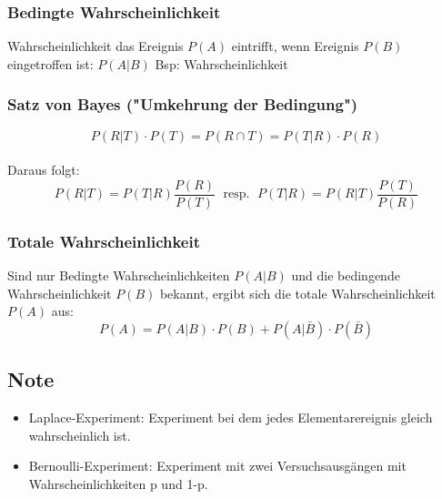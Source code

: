 \documentclass[margin=normal]{tex/hsrzf}
\begin{document}
\begin{multicols}{2}

    \subsubsection{Bedingte Wahrscheinlichkeit}
    Wahrscheinlichkeit das Ereignis $P(A)$ eintrifft,
    wenn Ereignis $P(B)$ eingetroffen ist: $P(A|B)$
    Bsp: Wahrscheinlichkeit
    \subsubsection*{Satz von Bayes ("Umkehrung der Bedingung")}
    $$P(R|T) \cdot P(T) = P(R \cap T) = P(T|R) \cdot P(R)$$
    \\ Daraus folgt: $$P(R|T) = P(T|R) \frac{P(R)}{P(T)}\;
        \textrm{ resp. } \; P(T|R) = P(R|T) \frac{P(T)}{P(R)}$$
    \subsubsection{Totale Wahrscheinlichkeit}
    Sind nur Bedingte Wahrscheinlichkeiten $P(A|B)$ und die bedingende Wahrscheinlichkeit
    $P(B)$ bekannt, ergibt sich die totale Wahrscheinlichkeit $P(A)$ aus:
    $$P(A) = P(A|B) \cdot P(B) + P(A|\bar{B})\cdot P(\bar{B})$$
    \subsection*{Note}
    \begin{itemize}
        \item Laplace-Experiment: Experiment bei dem jedes Elementarereignis gleich wahrscheinlich ist.
        \item Bernoulli-Experiment: Experiment mit zwei Versuchsausgängen mit Wahrscheinlichkeiten p und 1-p.
    \end{itemize}
\end{multicols}
\end{document}
